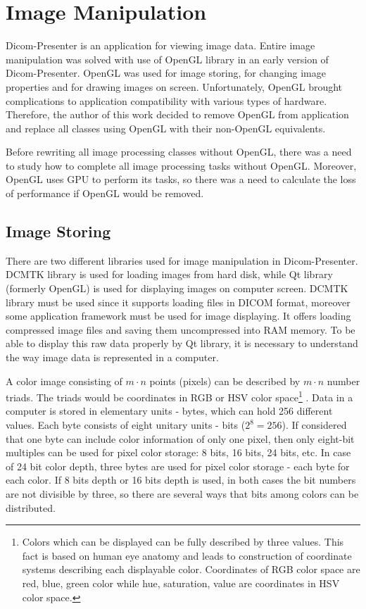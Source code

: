 \chapter{Image Manipulation}
\vspace{-10mm}

Dicom-Presenter is an application for viewing image data. Entire image manipulation was solved with use of OpenGL library in an early version of Dicom-Presenter. OpenGL was used for image storing, for changing image properties and for drawing images on screen. Unfortunately, OpenGL brought complications to application compatibility with various types of hardware. Therefore, the author of this work decided to remove OpenGL from application and replace all classes using OpenGL with their non-OpenGL equivalents. 

Before rewriting all image processing classes without OpenGL, there was a need to study how to complete all image processing tasks without OpenGL. Moreover, OpenGL uses GPU to perform its tasks, so there was a need to calculate the loss of performance if OpenGL would be removed. 

\section{Image Storing}
\label{rawdata}
There are two different libraries used for image manipulation in Dicom-Presenter. DCMTK library is used for loading images from hard disk, while Qt library (formerly OpenGL) is used for displaying images on computer screen. DCMTK library must be used since it supports loading files in DICOM format, moreover some application framework must be used for image displaying. It offers loading compressed image files and saving them uncompressed into RAM memory. To be able to display this raw data properly by Qt library, it is necessary to understand the way image data is represented in a computer. 

A color image consisting of $m \cdot n$ points (pixels) can be described by $m \cdot n$ number triads. The triads would be coordinates in RGB or HSV color space\footnote{Colors which can be displayed can be fully described by three values. This fact is based on human eye anatomy and leads to construction of coordinate systems describing each displayable color. Coordinates of RGB color space are red, blue, green color while hue, saturation, value are coordinates in HSV color space.} \cite[page~211]{imageprocessingintroduction}. Data in a computer is stored in elementary units - bytes, which can hold 256 different values. Each byte consists of eight unitary units - bits ($2^8 = 256 $). If considered that one byte can include color information of only one pixel, then only eight-bit multiples can be used for pixel color storage: 8 bits, 16 bits, 24 bits, etc.\cite[p.~208]{colorphotography} In case of 24 bit color depth, three bytes are used for pixel color storage - each byte for each color. If 8 bits depth or 16 bits depth is used, in both cases the bit numbers are not divisible by three, so there are several ways that bits among colors can be distributed.
 
